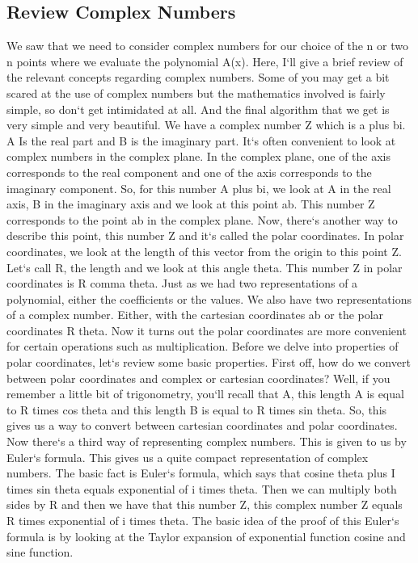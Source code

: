 \subsection{Review  Complex Numbers}
We saw that we need to consider complex numbers for our choice of the n or two n points where we evaluate the polynomial A(x).
Here, I`ll give a brief review of the relevant concepts regarding complex numbers.
Some of you may get a bit scared at the use of complex numbers but the mathematics involved is fairly simple, so don`t get intimidated at all.
And the final algorithm that we get is very simple and very beautiful.
We have a complex number Z which is a plus bi.
A Is the real part and B is the imaginary part.
It`s often convenient to look at complex numbers in the complex plane.
In the complex plane, one of the axis corresponds to the real component and one of the axis corresponds to the imaginary component.
So, for this number A plus bi, we look at A in the real axis, B in the imaginary axis and we look at this point ab.
This number Z corresponds to the point ab in the complex plane.
Now, there`s another way to describe this point, this number Z and it`s called the polar coordinates.
In polar coordinates, we look at the length of this vector from the origin to this point Z\@.
Let`s call R, the length and we look at this angle theta.
This number Z in polar coordinates is R comma theta.
Just as we had two representations of a polynomial, either the coefficients or the values.
We also have two representations of a complex number.
Either, with the cartesian coordinates ab or the polar coordinates R theta.
Now it turns out the polar coordinates are more convenient for certain operations such as multiplication.
Before we delve into properties of polar coordinates, let`s review some basic properties.
First off, how do we convert between polar coordinates and complex or cartesian coordinates? Well, if you remember a little bit of trigonometry, you`ll recall that A, this length A is equal to R times cos theta and this length B is equal to R times sin theta.
So, this gives us a way to convert between cartesian coordinates and polar coordinates.
Now there`s a third way of representing complex numbers.
This is given to us by Euler`s formula.
This gives us a quite compact representation of complex numbers.
The basic fact is Euler`s formula, which says that cosine theta plus I times sin theta equals exponential of i times theta.
Then we can multiply both sides by R and then we have that this number Z, this complex number Z equals R times exponential of i times theta.
The basic idea of the proof of this Euler`s formula is by looking at the Taylor expansion of exponential function cosine and sine function.

